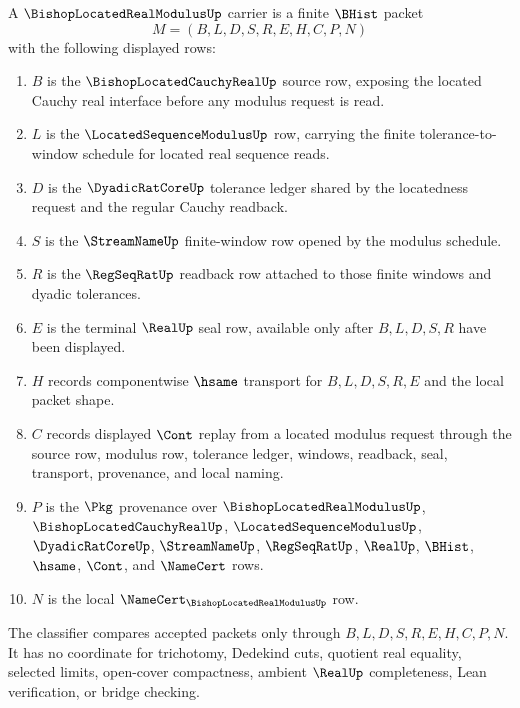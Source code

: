 \begin{definition}
\label{def:bishop-located-real-modulus-carrier}
A $\BishopLocatedRealModulusUp$ carrier is a finite $\BHist$ packet
$$
M=(B,L,D,S,R,E,H,C,P,N)
$$
with the following displayed rows:
\begin{enumerate}
\item $B$ is the $\BishopLocatedCauchyRealUp$ source row, exposing the located Cauchy real interface before any modulus request is read.
\item $L$ is the $\LocatedSequenceModulusUp$ row, carrying the finite tolerance-to-window schedule for located real sequence reads.
\item $D$ is the $\DyadicRatCoreUp$ tolerance ledger shared by the locatedness request and the regular Cauchy readback.
\item $S$ is the $\StreamNameUp$ finite-window row opened by the modulus schedule.
\item $R$ is the $\RegSeqRatUp$ readback row attached to those finite windows and dyadic tolerances.
\item $E$ is the terminal $\RealUp$ seal row, available only after $B,L,D,S,R$ have been displayed.
\item $H$ records componentwise $\hsame$ transport for $B,L,D,S,R,E$ and the local packet shape.
\item $C$ records displayed $\Cont$ replay from a located modulus request through the source row, modulus row, tolerance ledger, windows, readback, seal, transport, provenance, and local naming.
\item $P$ is the $\Pkg$ provenance over $\BishopLocatedRealModulusUp$, $\BishopLocatedCauchyRealUp$, $\LocatedSequenceModulusUp$, $\DyadicRatCoreUp$, $\StreamNameUp$, $\RegSeqRatUp$, $\RealUp$, $\BHist$, $\hsame$, $\Cont$, and $\NameCert$ rows.
\item $N$ is the local $\NameCert_{\BishopLocatedRealModulusUp}$ row.
\end{enumerate}
The classifier compares accepted packets only through $B,L,D,S,R,E,H,C,P,N$. It has no coordinate for trichotomy, Dedekind cuts, quotient real equality, selected limits, open-cover compactness, ambient $\RealUp$ completeness, Lean verification, or bridge checking.
\end{definition}

